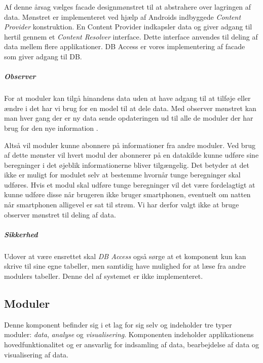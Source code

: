 Af denne årsag vælges facade designmønstret til at abstrahere over lagringen af data.
Mønstret er implementeret ved hjælp af Androids indbyggede \textit{Content Provider} konstruktion\citep{contentprovider}.
En Content Provider indkapsler data og giver adgang til hertil gennem et \textit{Content Resolver} interface.
Dette interface anvendes til deling af data mellem flere applikationer.
DB Access er vores implementering af facade som giver adgang til DB.

\subparagraph{Observer}
For at moduler kan tilgå hinandens data uden at have adgang til at tilføje eller ændre i det har vi brug for en model til at dele data.
Med observer mønstret kan man hver gang der er ny data sende opdateringen ud til alle de moduler der har brug for den nye information \citep[p.~244]{gamma1994design}.

Altså vil moduler kunne abonnere på informationer fra andre moduler.
Ved brug af dette mønster vil hvert modul der abonnerer på en datakilde kunne udføre sine beregninger i det øjeblik informationerne bliver tilgængelig.
Det betyder at det ikke er muligt for modulet selv at bestemme hvornår tunge beregninger skal udføres.
Hvis et modul skal udføre tunge beregninger vil det være fordelagtigt at kunne udføre disse når brugeren ikke bruger smartphonen, eventuelt om natten når smartphonen alligevel er sat til strøm.
Vi har derfor valgt ikke at bruge observer mønstret til deling af data.

\subparagraph{Sikkerhed}
Udover at være ensrettet skal \textit{DB Access} også sørge at et komponent kun kan skrive til sine egne tabeller, men samtidig have mulighed for at læse fra andre modulers tabeller.
Denne del af systemet er ikke implementeret.

\subsection{Moduler}
Denne komponent befinder sig i et lag for sig selv og indeholder tre typer moduler: \textit{data}, \textit{analyse} og \textit{visualisering}.
Komponenten indeholder applikationens hovedfunktionalitet og er ansvarlig for indsamling af data, bearbejdelse af data og visualisering af data.

